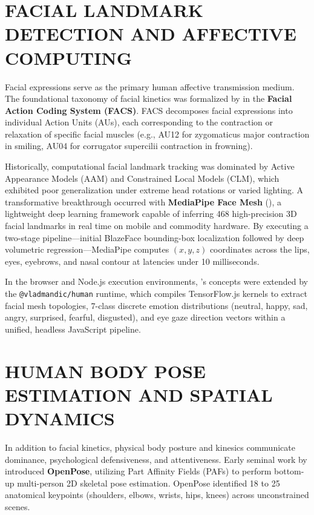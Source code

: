 \documentclass[12pt,a4paper,oneside]{report}
\providecommand{\parencite}[1]{(\cite{#1})}
\providecommand{\textcite}[1]{\cite{#1}}
\begin{document}
\section{FACIAL LANDMARK DETECTION AND AFFECTIVE COMPUTING}
Facial expressions serve as the primary human affective transmission medium. The foundational taxonomy of facial kinetics was formalized by \textcite{ekman1978facial} in the \textbf{Facial Action Coding System (FACS)}. FACS decomposes facial expressions into individual Action Units (AUs), each corresponding to the contraction or relaxation of specific facial muscles (e.g., AU12 for zygomaticus major contraction in smiling, AU04 for corrugator supercilii contraction in frowning).

Historically, computational facial landmark tracking was dominated by Active Appearance Models (AAM) and Constrained Local Models (CLM), which exhibited poor generalization under extreme head rotations or varied lighting. A transformative breakthrough occurred with \textbf{MediaPipe Face Mesh} \parencite{lugaresi2019mediapipe}, a lightweight deep learning framework capable of inferring 468 high-precision 3D facial landmarks in real time on mobile and commodity hardware. By executing a two-stage pipeline—initial BlazeFace bounding-box localization followed by deep volumetric regression—MediaPipe computes $(x, y, z)$ coordinates across the lips, eyes, eyebrows, and nasal contour at latencies under 10 milliseconds. 

In the browser and Node.js execution environments, \textcite{lugaresi2019mediapipe}'s concepts were extended by the \texttt{@vladmandic/human} runtime, which compiles TensorFlow.js kernels to extract facial mesh topologies, 7-class discrete emotion distributions (neutral, happy, sad, angry, surprised, fearful, disgusted), and eye gaze direction vectors within a unified, headless JavaScript pipeline.

\section{HUMAN BODY POSE ESTIMATION AND SPATIAL DYNAMICS}
In addition to facial kinetics, physical body posture and kinesics communicate dominance, psychological defensiveness, and attentiveness. Early seminal work by \textcite{cao2017realtime} introduced \textbf{OpenPose}, utilizing Part Affinity Fields (PAFs) to perform bottom-up multi-person 2D skeletal pose estimation. OpenPose identified 18 to 25 anatomical keypoints (shoulders, elbows, wrists, hips, knees) across unconstrained scenes. 
\end{document}
